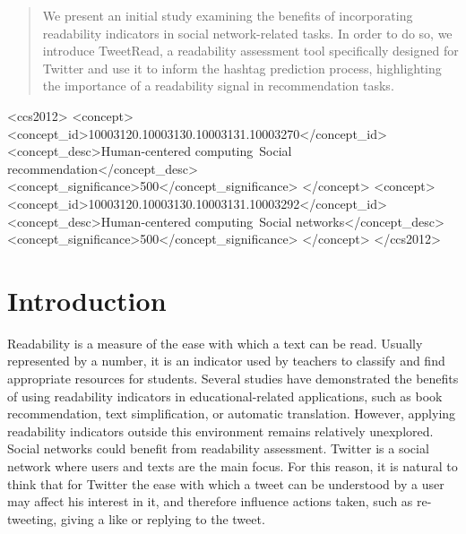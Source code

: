 \documentclass{sig-alternate-05-2015}
\begin{document}
\maketitle
\begin{abstract}
We present an initial study examining the benefits of incorporating readability indicators in social network-related tasks. 
In order to do so, we introduce TweetRead, a readability assessment tool specifically designed for Twitter and use it to inform the hashtag prediction process, highlighting the importance of a readability signal in recommendation tasks.
\end{abstract}
%
%
 \begin{CCSXML}
<ccs2012>
<concept>
<concept_id>10003120.10003130.10003131.10003270</concept_id>
<concept_desc>Human-centered computing~Social recommendation</concept_desc>
<concept_significance>500</concept_significance>
</concept>
<concept>
<concept_id>10003120.10003130.10003131.10003292</concept_id>
<concept_desc>Human-centered computing~Social networks</concept_desc>
<concept_significance>500</concept_significance>
</concept>
</ccs2012>
\end{CCSXML}


%
%

%
%
\printccsdesc



\section{Introduction}

Readability is a measure of the ease with which a text can be read. Usually represented by a number, it is an indicator used by teachers to classify and find appropriate resources for students. Several studies have demonstrated the benefits of using readability indicators in educational-related applications, %
such as book recommendation, text simplification, or automatic translation. However, applying readability indicators outside this environment remains relatively unexplored. Social networks could benefit from readability assessment. Twitter is a social network where users and texts are the main focus. For this reason, it is natural to think that for Twitter the ease with which a tweet can be understood by a user may affect his interest in it, and therefore influence actions taken, such as re-tweeting, giving a like or replying to the tweet. 
\end{document}
